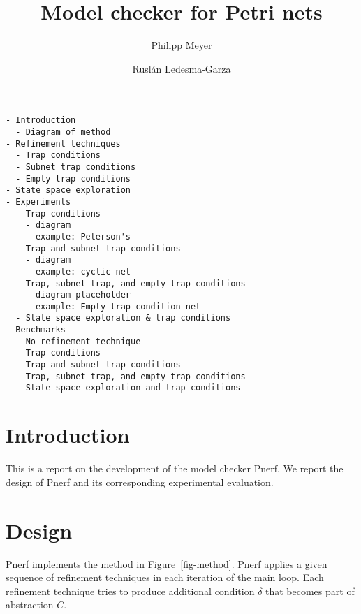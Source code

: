 \documentclass{article}
\begin{document}
\title{Model checker for Petri nets}
\author{Philipp Meyer \and Rusl\'{a}n Ledesma-Garza}

\begin{verbatim}
- Introduction
  - Diagram of method
- Refinement techniques
  - Trap conditions
  - Subnet trap conditions
  - Empty trap conditions
- State space exploration
- Experiments
  - Trap conditions
    - diagram
    - example: Peterson's
  - Trap and subnet trap conditions
    - diagram
    - example: cyclic net
  - Trap, subnet trap, and empty trap conditions
    - diagram placeholder
    - example: Empty trap condition net
  - State space exploration & trap conditions
- Benchmarks
  - No refinement technique
  - Trap conditions
  - Trap and subnet trap conditions
  - Trap, subnet trap, and empty trap conditions
  - State space exploration and trap conditions
\end{verbatim}

\section{Introduction}

This is a report on the development of the model checker Pnerf. We
report the design of Pnerf and its corresponding experimental
evaluation.

\section{Design}

Pnerf implements the method in Figure~\ref{fig-method}. Pnerf applies
a given sequence of refinement techniques in each iteration of the
main loop. Each refinement technique tries to produce additional condition
$\delta$ that becomes part of abstraction $C$.
\end{document}
